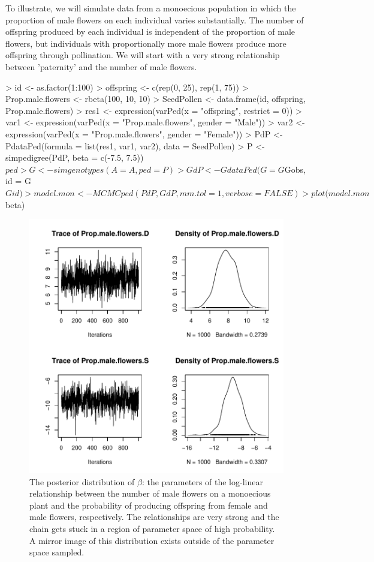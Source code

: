 \documentclass{article}
\begin{document}
  To illustrate, we will simulate data from a monoecious population in which the proportion of male flowers on each individual varies substantially. The number of offspring produced by each individual is independent of the proportion of male flowers, but individuals with proportionally more male flowers produce more offspring through pollination.  We will start with a very strong relationship between 'paternity' and the number of male flowers.
 
\begin{Schunk}
\begin{Sinput}
> id <- as.factor(1:100)
> offspring <- c(rep(0, 25), rep(1, 75))
> Prop.male.flowers <- rbeta(100, 10, 10)
> SeedPollen <- data.frame(id, offspring, Prop.male.flowers)
> res1 <- expression(varPed(x = "offspring", restrict = 0))
> var1 <- expression(varPed(x = "Prop.male.flowers", gender = "Male"))
> var2 <- expression(varPed(x = "Prop.male.flowers", gender = "Female"))
> PdP <- PdataPed(formula = list(res1, var1, var2), data = SeedPollen)
> P <- simpedigree(PdP, beta = c(-7.5, 7.5))$ped
> G <- simgenotypes(A = A, ped = P)
> GdP <- GdataPed(G = G$Gobs, id = G$Gid)
> model.mon <- MCMCped(PdP, GdP, mm.tol = 1, verbose = FALSE)
> plot(model.mon$beta)
\end{Sinput}
\end{Schunk}


\begin{figure}[!h]
\begin{center}
\includegraphics{Tutorial-104}
\end{center}
\caption{The posterior distribution of $\beta$: the parameters of the log-linear relationship between the number of male flowers on a monoecious plant and the probability of producing offspring from female and male flowers, respectively. The relationships are very strong and the chain gets stuck in a region of parameter space of high probability.  A mirror image of this distribution exists outside of the parameter space sampled.}
\label{mon1-fig}
\end{figure}
\end{document}
